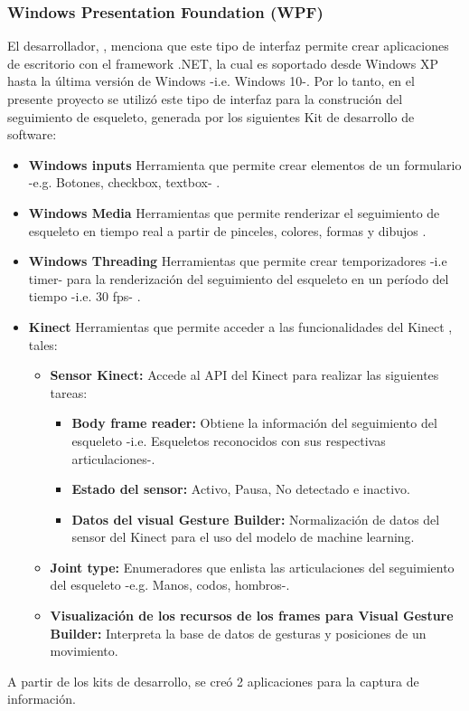 \subsubsection{Windows Presentation Foundation (WPF)}
\label{ins:UI:wpf}
El desarrollador, , menciona que este tipo de interfaz permite crear aplicaciones de escritorio con el framework .NET, la cual es soportado desde Windows XP hasta la \'ultima versi\'on de Windows -i.e. Windows 10-. Por lo tanto, en el presente proyecto se utiliz\'o este tipo de interfaz para la construci\'on del seguimiento de esqueleto, generada por los siguientes Kit de desarrollo de software:
\begin{itemize}
	\item \textbf{Windows inputs} Herramienta que permite crear elementos de un formulario -e.g. Botones, checkbox, textbox- \cite{wpfWindows2019}.
	\item \textbf{Windows Media} Herramientas que permite renderizar el seguimiento de esqueleto en tiempo real a partir de pinceles, colores, formas y dibujos \cite{WindowMedia2019}.
	\item \textbf{Windows Threading} Herramientas que permite crear temporizadores -i.e timer- para la renderizaci\'on del seguimiento del esqueleto en un per\'iodo del tiempo -i.e. 30 fps- \cite{WindowThreading2019}.
	\item \textbf{Kinect} Herramientas que permite acceder a las funcionalidades del Kinect \cite{WindowKinect2019}, tales:
	\begin{itemize}
	\item \textbf{Sensor Kinect:} Accede al API del Kinect para realizar las siguientes tareas:
		\begin{itemize}
				\item \textbf{Body frame reader:} Obtiene la informaci\'on del seguimiento del esqueleto -i.e. Esqueletos reconocidos con sus respectivas articulaciones-.
				\item \textbf{Estado del sensor:} Activo, Pausa, No detectado e inactivo.
				\item \textbf{Datos del visual Gesture Builder:} Normalizaci\'on de datos del sensor del Kinect para el uso del modelo de machine learning.
		\end{itemize}	
			\item \textbf{Joint type:} Enumeradores que enlista las articulaciones del seguimiento del esqueleto -e.g. Manos, codos, hombros-.
			\item \textbf{Visualizaci\'on de los recursos de los frames para Visual Gesture Builder:} Interpreta la base de datos de gesturas y posiciones de un movimiento.
	\end{itemize}	 
\end{itemize}
A partir de los kits de desarrollo, se cre\'o 2 aplicaciones para la captura de informaci\'on.
